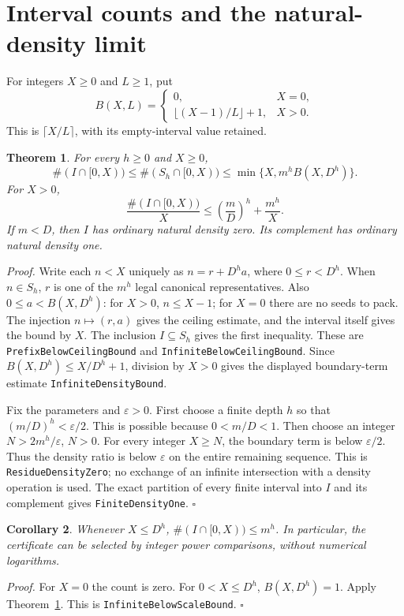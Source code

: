 \documentclass[11pt,letterpaper]{article}
\newtheorem{theorem}{Theorem}
\newtheorem{corollary}[theorem]{Corollary}
\newenvironment{proof}{\noindent\textit{Proof.}}{\hfill\(\square\)}
\begin{document}
\section{Interval counts and the natural-density limit}

For integers \(X\ge0\) and \(L\ge1\), put
\[
B(X,L)=
\begin{cases}
0,&X=0,\\
\lfloor(X-1)/L\rfloor+1,&X>0.
\end{cases}
\]
This is \(\lceil X/L\rceil\), with its empty-interval value retained.

\begin{theorem}\label{TheoremDensity}
For every \(h\ge0\) and \(X\ge0\),
\[
\#(I\cap[0,X))\le \#(S_h\cap[0,X))
 \le \min\{X,m^hB(X,D^h)\}.
\]
For \(X>0\),
\[
\frac{\#(I\cap[0,X))}{X}
 \le \left(\frac mD\right)^h+\frac{m^h}{X}.
\]
If \(m<D\), then \(I\) has ordinary natural density zero.
Its complement has ordinary natural density one.
\end{theorem}
\begin{proof}
Write each \(n<X\) uniquely as \(n=r+D^h a\),
where \(0\le r<D^h\).
When \(n\in S_h\), \(r\) is one of the \(m^h\) legal canonical representatives.
Also \(0\le a<B(X,D^h)\): for \(X>0\), \(n\le X-1\);
for \(X=0\) there are no seeds to pack.
The injection \(n\mapsto(r,a)\) gives the ceiling estimate,
and the interval itself gives the bound by \(X\).
The inclusion \(I\subseteq S_h\) gives the first inequality.
These are \texttt{PrefixBelowCeilingBound} and
\texttt{InfiniteBelowCeilingBound}.
Since \(B(X,D^h)\le X/D^h+1\), division by \(X>0\)
gives the displayed boundary-term estimate
\texttt{InfiniteDensityBound}.

Fix the parameters and \(\varepsilon>0\).
First choose a finite depth \(h\) so that \((m/D)^h<\varepsilon/2\).
This is possible because \(0<m/D<1\).
Then choose an integer \(N>2m^h/\varepsilon\), \(N>0\).
For every integer \(X\ge N\), the boundary term is below \(\varepsilon/2\).
Thus the density ratio is below \(\varepsilon\) on the entire remaining sequence.
This is \texttt{ResidueDensityZero}; no exchange of an infinite intersection
with a density operation is used.
The exact partition of every finite interval into \(I\) and its complement
gives \texttt{FiniteDensityOne}.
\end{proof}

\begin{corollary}
Whenever \(X\le D^h\), \(\#(I\cap[0,X))\le m^h\).
In particular, the certificate can be selected by integer power comparisons,
without numerical logarithms.
\end{corollary}
\begin{proof}
For \(X=0\) the count is zero.
For \(0<X\le D^h\), \(B(X,D^h)=1\).
Apply Theorem~\ref{TheoremDensity}.
This is \texttt{InfiniteBelowScaleBound}.
\end{proof}
\end{document}
